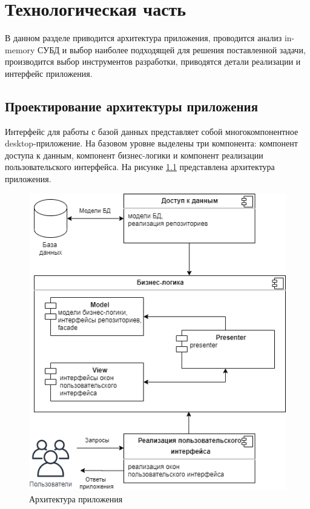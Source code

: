 \chapter{Технологическая часть}

В данном разделе приводится архитектура приложения, проводится анализ in-memory СУБД и выбор наиболее подходящей для решения поставленной задачи, производится выбор инструментов разработки, приводятся детали реализации и интерфейс приложения.

\section{Проектирование архитектуры приложения}

Интерфейс для работы с базой данных представляет собой  многокомпонентное desktop-приложение. На базовом уровне выделены три компонента: компонент доступа к данным, компонент бизнес-логики и компонент реализации пользовательского интерфейса. На рисунке \ref{img:components} представлена архитектура приложения.

\begin{figure}[h!]
	\begin{center}
		\includegraphics[scale=0.6]{../imgs/uml/components.png}
	\end{center}
	\captionsetup{justification=centering}
	\caption{Архитектура приложения}
	\label{img:components}
\end{figure}

